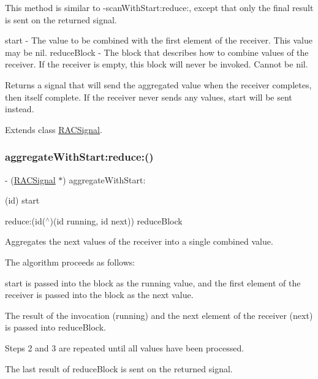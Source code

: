 This method is similar to -\/scan\+With\+Start\+:reduce\+:, except that only the final result is sent on the returned signal.

start -\/ The value to be combined with the first element of the receiver. This value may be {\ttfamily nil}. reduce\+Block -\/ The block that describes how to combine values of the receiver. If the receiver is empty, this block will never be invoked. Cannot be nil.

Returns a signal that will send the aggregated value when the receiver completes, then itself complete. If the receiver never sends any values, {\ttfamily start} will be sent instead. 

Extends class \mbox{\hyperlink{interface_r_a_c_signal_a4b872b6c2322aa37f98282043e768582}{R\+A\+C\+Signal}}.

\mbox{\label{category_r_a_c_signal_07_operations_08_a4b872b6c2322aa37f98282043e768582}} 
\subsubsection{\texorpdfstring{aggregate\+With\+Start\+:reduce\+:()}{aggregateWithStart:reduce:()}\hspace{0.1cm}{\footnotesize\ttfamily [2/3]}}
{\footnotesize\ttfamily -\/ (\mbox{\hyperlink{interface_r_a_c_signal}{R\+A\+C\+Signal}} $\ast$) aggregate\+With\+Start\+: \begin{DoxyParamCaption}\item[{(id)}]{start }\item[{reduce:(id($^\wedge$)(id running, id next))}]{reduce\+Block }\end{DoxyParamCaption}}

Aggregates the {\ttfamily next} values of the receiver into a single combined value.

The algorithm proceeds as follows\+:


\begin{DoxyEnumerate}
\item {\ttfamily start} is passed into the block as the {\ttfamily running} value, and the first element of the receiver is passed into the block as the {\ttfamily next} value.
\item The result of the invocation ({\ttfamily running}) and the next element of the receiver ({\ttfamily next}) is passed into {\ttfamily reduce\+Block}.
\item Steps 2 and 3 are repeated until all values have been processed.
\item The last result of {\ttfamily reduce\+Block} is sent on the returned signal.
\end{DoxyEnumerate}

